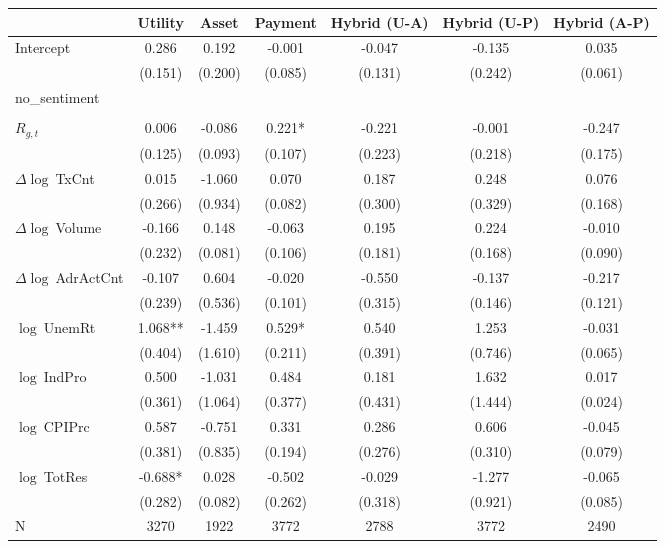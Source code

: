 \begin{table}[ht]
\centering
\scriptsize
\setlength{\tabcolsep}{4pt}
\begin{tabular}{l *{6}{c}}
\toprule
 & Utility & Asset & Payment & Hybrid (U-A) & Hybrid (U-P) & Hybrid (A-P) \\
\midrule
Intercept & 0.286 & 0.192 & -0.001 & -0.047 & -0.135 & 0.035 \\
 & (0.151) & (0.200) & (0.085) & (0.131) & (0.242) & (0.061) \\
\addlinespace
no_sentiment &  &  &  &  &  &  \\
 &  &  &  &  &  &  \\
\addlinespace
$R_{g,t}$ & 0.006 & -0.086 & 0.221* & -0.221 & -0.001 & -0.247 \\
 & (0.125) & (0.093) & (0.107) & (0.223) & (0.218) & (0.175) \\
\addlinespace
$\Delta\log\ $TxCnt & 0.015 & -1.060 & 0.070 & 0.187 & 0.248 & 0.076 \\
 & (0.266) & (0.934) & (0.082) & (0.300) & (0.329) & (0.168) \\
\addlinespace
$\Delta\log\ $Volume & -0.166 & 0.148 & -0.063 & 0.195 & 0.224 & -0.010 \\
 & (0.232) & (0.081) & (0.106) & (0.181) & (0.168) & (0.090) \\
\addlinespace
$\Delta\log\ $AdrActCnt & -0.107 & 0.604 & -0.020 & -0.550 & -0.137 & -0.217 \\
 & (0.239) & (0.536) & (0.101) & (0.315) & (0.146) & (0.121) \\
\addlinespace
$\log\ $UnemRt & 1.068** & -1.459 & 0.529* & 0.540 & 1.253 & -0.031 \\
 & (0.404) & (1.610) & (0.211) & (0.391) & (0.746) & (0.065) \\
\addlinespace
$\log\ $IndPro & 0.500 & -1.031 & 0.484 & 0.181 & 1.632 & 0.017 \\
 & (0.361) & (1.064) & (0.377) & (0.431) & (1.444) & (0.024) \\
\addlinespace
$\log\ $CPIPrc & 0.587 & -0.751 & 0.331 & 0.286 & 0.606 & -0.045 \\
 & (0.381) & (0.835) & (0.194) & (0.276) & (0.310) & (0.079) \\
\addlinespace
$\log\ $TotRes & -0.688* & 0.028 & -0.502 & -0.029 & -1.277 & -0.065 \\
 & (0.282) & (0.082) & (0.262) & (0.318) & (0.921) & (0.085) \\
\addlinespace
\midrule
N & 3270 & 1922 & 3772 & 2788 & 3772 & 2490 \\

\end{tabular}
\end{table}
